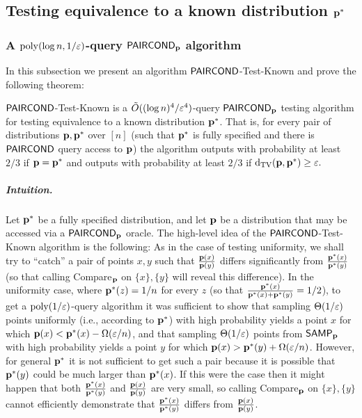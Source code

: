 \subsection{Testing equivalence to a known distribution \texorpdfstring{$\mathbf{p}^\ast$}{\D*}}\label{sec:knownDstar}
\subsubsection{\texorpdfstring{A $\operatorname*{poly}(\log n, 1/\varepsilon)$-query ${\sf PAIRCOND}_{\mathbf{p}}$ algorithm}{A poly(log n, 1/eps)-query \PCOND algorithm}}

In this subsection we present an algorithm {\sc ${\sf PAIRCOND}$-Test-Known}
and prove the following theorem:
\begin{theorem} \label{thm:paircond-test-known}
{\sc ${\sf PAIRCOND}$-Test-Known} is a $\tilde{O}((\log n)^4/\varepsilon^4)$-query ${\sf PAIRCOND}_{\mathbf{p}}$
testing algorithm for testing equivalence to a known distribution $\mathbf{p}^\ast$.
{That is,}
for every pair of distributions $\mathbf{p},\mathbf{p}^\ast$ over $[n]$
{(such that $\mathbf{p}^\ast$ is fully specified and there is ${\sf PAIRCOND}$ query access to $\mathbf{p}$)}
the algorithm outputs \accept with probability at least $2/3$ if $\mathbf{p} =
\mathbf{p}^\ast$ and outputs \reject with probability at least $2/3$ if
\mbox{$\operatorname{d}_{\textrm{TV}}(\mathbf{p},\mathbf{p}^\ast) \geq \varepsilon.$}
\end{theorem}

\subparagraph{Intuition.}
Let $\mathbf{p}^\ast$ be a fully specified distribution,
and let $\mathbf{p}$ be a distribution
that may be accessed via a ${\sf PAIRCOND}_{\mathbf{p}}$ oracle.
The high-level idea of the {\sc ${\sf PAIRCOND}$-Test-Known} algorithm is the
following:  As in the case of
testing uniformity, we shall try to ``catch'' a pair of points $x,y$
such that $\frac{\mathbf{p}(x)}{\mathbf{p}(y)}$ differs significantly
from $\frac{\mathbf{p}^\ast(x)}{\mathbf{p}^\ast(y)}$
(so that calling {\sc Compare}$_{\mathbf{p}}$ on $\{x\},\{y\}$
will reveal this difference).
In the uniformity case,
where $\mathbf{p}^\ast(z) = 1/n$ for every $z$ (so that
$\frac{\mathbf{p}^\ast(x)}{\mathbf{p}^\ast(x)+\mathbf{p}^\ast(y)} = 1/2$), to get a
$\operatorname*{poly}(1/\varepsilon)$-query algorithm it was sufficient to show
that sampling
$\Theta(1/\varepsilon)$ points uniformly (i.e., according to
$\mathbf{p}^\ast$)
with high probability
yields a point $x$ for which
$\mathbf{p}(x) < \mathbf{p}^\ast(x) - \Omega(\varepsilon/n)$, and that sampling
$\Theta(1/\varepsilon)$ points from ${\sf SAMP}_{\mathbf{p}}$
with high probability yields a point $y$ for
which $\mathbf{p}(x) > \mathbf{p}^\ast(y) + \Omega(\varepsilon/n)$.
However, for general $\mathbf{p}^\ast$ it is not sufficient to get such a pair
because it is possible that $\mathbf{p}^\ast(y)$ could be much larger than
$\mathbf{p}^\ast(x)$.  If this were the case then it might happen that
both $\frac{\mathbf{p}^\ast(x)}{\mathbf{p}^\ast(y)}$
and $\frac{\mathbf{p}(x)}{\mathbf{p}(y)}$ are very small, so calling {\sc Compare}$_{\mathbf{p}}$ on $\{x\},\{y\}$ cannot efficiently
demonstrate that
$\frac{\mathbf{p}^\ast(x)}{\mathbf{p}^\ast(y)}$ differs from
$\frac{\mathbf{p}(x)}{\mathbf{p}(y)}$.

